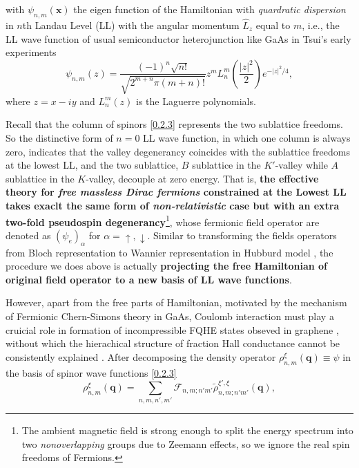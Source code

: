 \documentclass[bachelor,english,numbers]{ustcthesis}
\begin{document}
		with $\psi_{n,m}(\bm{x})$ the eigen function of the Hamiltonian with \emph{quardratic dispersion} in $n$th Landau Level (LL) with the angular momentum $\hat{L}_z$ equal to $m$, i.e., the LL wave function of usual semiconductor heterojunction like GaAs in Tsui's early experiments \cite{tsui1982two,tHoke20074}
		\begin{equation*}
			\psi_{n,m}(z)=\dfrac{(-1)^n\sqrt{n!}}{\sqrt{2^{m+n}\pi (m+n)!}}z^m L_n^m\left(\dfrac{|z|^2}{2}\right)e^{-|z|^2/4},
		\end{equation*}
		where $z=x-iy$ and $L_n^m(z)$ is the Laguerre polynomials.\par
		Recall that the column of spinors \eqref{0.2.3} represents the two sublattice freedoms. So the distinctive form of $n=0$ LL wave function, in which one column is always zero, indicates that the valley degenerancy coincides with the sublattice freedoms at the lowest LL, and the two sublattice, $B$ sublattice in the $K'$-valley while $A$ sublattice in the $K$-valley, decouple at zero energy. That is, {\bf the effective theory for \emph{free massless Dirac fermions} constrained at the Lowest LL takes exaclt the same form of \emph{non-relativistic} case but with an extra two-fold pseudospin degenerancy}\footnote{The ambient magnetic field is strong enough to split the energy spectrum into two \emph{nonoverlapping} groups due to Zeemann effects, so we ignore the real spin freedoms of Fermions.}, whose fermionic field operator are denoted as $(\psi_e)_\alpha$ for $\alpha=\uparrow,\downarrow$. Similar to transforming the fields operators from Bloch representation to Wannier representation in Hubburd model \cite{nagaosa1999quantum}, the procedure we does above is actually {\bf projecting the free Hamiltonian of original field operator to a new basis of LL wave functions}.\par
		However, apart from the free parts of Hamiltonian, motivated by the mechanism of Fermionic Chern-Simons theory in GaAs, Coulomb interaction must play a cruicial role in formation of incompressible FQHE states obseved in graphene \cite{bolotin2009observation}, without which the hierachical structure of fraction Hall conductance cannot be consistently explained \cite{simon1998chern,lopez1991fractional}. After decomposing the density operator $\rho^{\xi}_{n,m}(\bm{q})\equiv\psi$ in the basis of spinor wave functions \eqref{0.2.3}
		\begin{equation*}
			\rho^{\xi}_{n,m}(\bm{q})=\sum_{n,m,n',m'}\mathcal{F}_{n,m;n'm'}\widetilde{\rho}^{\xi',\xi}_{n,m;n'm'}(\bm{q}),
		\end{equation*}
\end{document}
